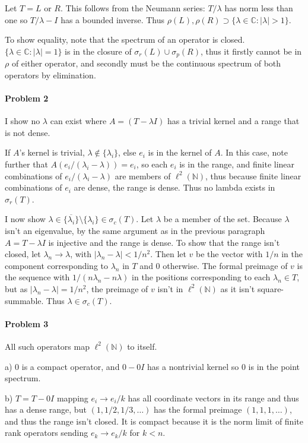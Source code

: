 \documentclass[12pt]{article}
\newcommand{\s}{\sigma}
\renewcommand{\l}{\lambda}
\newcommand{\C}{\mathbb{C}}
\begin{document}
Let $T = L$ or $R$. This follows from the
Neumann series: $T/\l$ has norm less than one so $T/\l - I$ has a bounded inverse.
Thus $\rho(L), \rho(R) \supset \{\l\in\C: |\l|>1\}$.

To show equality, note that the spectrum of an operator is closed. $\{\l\in\C:
|\l|=1\}$ is in the closure of $\s_r(L) \cup \s_p(R)$, thus it
firstly cannot be in $\rho$ of either operator, and secondly must be the
continuous spectrum of both operators by elimination.

\paragraph{Problem 2}
I show no $\l$ can exist where $A = (T-\l I)$ has a trivial kernel and a
range that is not dense.

If $A$'s kernel is trivial, $\l \notin \{\l_i\}$, else $e_i$ is in the kernel of
$A$. In this case, note further that $A(e_i/(\l_i-\l)) = e_i$, so each $e_i$ is
in the range, and finite linear combinations of $e_i/(\l_i-\l)$ are members of
$\ell^2(\mathbb{N})$, thus because finite linear combinations of $e_i$ are dense,
the range is dense. Thus no lambda exists in $\sigma_r(T)$.

I now show $\lambda \in \overline{\{\l_i\}} \setminus \{\l_i\} \in \sigma_c(T)$.
Let $\l$ be a member of the set. Because $\l$ isn't an eigenvalue, by the same
argument as in the previous paragraph $A = T-\l I$ is injective and the range
is dense. To show that the range isn't closed, let $\l_n\to \l$, with $|\l_n-\l|
< 1/n^2$. Then let $v$ be the vector with $1/n$ in the component corresponding
to $\l_n$ in $T$ and 0 otherwise. The formal preimage of $v$ is the sequence with
$1/(n\l_n-n\l)$ in the positions corresponding to each $\l_n \in T$, but as
$|\l_n-\l| = 1/n^2$, the preimage of $v$ isn't in $\ell^2(\mathbb{N})$ as it
isn't square-summable. Thus $\l \in \sigma_c(T)$.

\paragraph{Problem 3}
All such operators map $\ell^2(\mathbb{N})$ to itself.

a) 0 is a compact operator, and $0 - 0I$ has a nontrivial kernel so 0 is in the
point spectrum.

b) $T = T - 0I$ 
 mapping $e_i \to e_i/k$ has all coordinate vectors in its
range and thus has a dense range, but $(1,1/2,1/3,\ldots)$ has the formal
preimage $(1,1,1,\ldots)$, and thus the range isn't closed. It is compact
because it is the norm limit of finite rank operators sending $e_k\to e_k/k$
for $k < n$.
\end{document}
